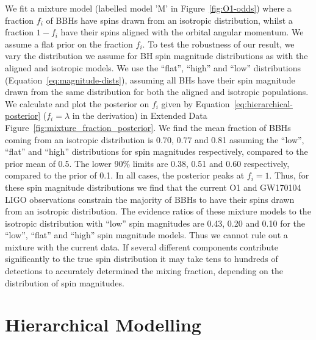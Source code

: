 \documentclass{nature-arxiv}
\begin{document}
\begin{methods}
We fit a mixture model\cite{Stevenson:2017spin} (labelled model 'M' in
Figure~\ref{fig:O1-odds}) where a fraction $f_i$ of BBHs have spins
drawn from an isotropic distribution, whilst a fraction $1 - f_i$ have
their spins aligned with the orbital angular momentum. We assume a
flat prior on the fraction $f_i$. To test the robustness of our
result, we vary the distribution we assume for BH spin magnitude
distributions as with the aligned and isotropic models. We use the
``flat'', ``high'' and ``low'' distributions
(Equation~\ref{eq:magnitude-dists}), assuming all BHs have their spin
magnitude drawn from the same distribution for both the aligned and
isotropic populations. We calculate and plot the posterior on $f_i$
given by Equation~\ref{eq:hierarchical-posterior} ($f_i=\lambda$ in
the derivation) in Extended Data
Figure~\ref{fig:mixture_fraction_posterior}. We find the mean fraction
of BBHs coming from an isotropic distribution is 0.70, 0.77 and 0.81
assuming the ``low'', ``flat'' and ``high'' distributions for spin
magnitudes respectively, compared to the prior mean of 0.5. The lower
90\% limits are 0.38, 0.51 and 0.60 respectively, compared to the
prior of 0.1. In all cases, the posterior peaks at $f_i = 1$. Thus,
for these spin magnitude distributions we find that the current O1 and
GW170104 LIGO observations constrain the majority of BBHs to have
their spins drawn from an isotropic distribution. The evidence ratios
of these mixture models to the isotropic distribution with ``low''
spin magnitudes are 0.43, 0.20 and 0.10 for the ``low'', ``flat'' and
``high'' spin magnitude models. Thus we cannot rule out a mixture with
the current data.  If several different components contribute
significantly to the true spin distribution it may take tens to
hundreds of detections to accurately determined the mixing fraction,
depending on the distribution of spin
magnitudes\cite{2017CQGra..34cLT01V,Stevenson:2017spin}.

\section{Hierarchical Modelling} 
\label{sec:hierarchical}


\end{methods}
\end{document}
